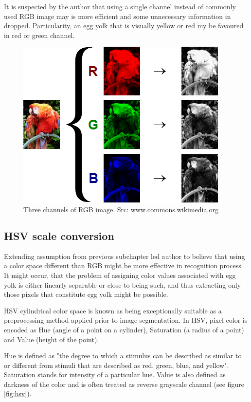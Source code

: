 \documentclass[12pt,twoside,a4paper]{article}
\begin{document}
It is suspected by the author that using a single channel instead of commonly used RGB image may is more efficient and some unnecessary information in dropped.
Particularity, an egg yolk that is visually yellow or red my be favoured in red or green channel.

\begin{figure}[H]
\centering
\includegraphics[width=0.4\paperwidth]{rgb}
\caption{Three channels of RGB image. Src: www.commons.wikimedia.org}\label{fig:rgb}
\end{figure}


\subsection{HSV scale conversion}

Extending assumption from previous subchapter led author to believe that using a color space different than RGB might be more effective in recognition process.
It might occur, that the problem of assigning color values associated with egg yolk is either linearly separable or close to being such, and thus extracting only those pixels that constitute egg yolk might be possible.

HSV cylindrical color space is known as being exceptionally suitable as a preprocessing method applied prior to image segmentation. \cite{hsv}
In HSV, pixel color is encoded as  Hue (angle of a point on a cylinder), Saturation (a radius of a point) and Value (height of the point).

Hue is defined as "the degree to which a stimulus can be described as similar to or different from stimuli that are described as red, green, blue, and yellow"\cite{hue}.
Saturation stands for intensity of a particular hue.
Value is also defined as darkness of the color and is often treated as reverse grayscale channel (see figure \ref{fig:hsv}).
\end{document}
